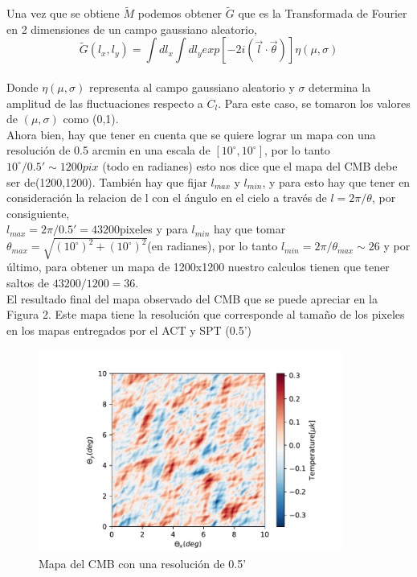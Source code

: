 \documentclass[a4paper]{article}
\begin{document}
Una vez que se obtiene $\tilde{M}$ podemos obtener $\tilde{G}$ que es la Transformada de Fourier en 2 dimensiones de un campo gaussiano aleatorio, 
\begin{equation}
    \tilde{G}(l_x,l_y)=\int dl_x \int dl_y exp[-2i(\vec{l} \cdot \vec{\theta})] \eta(\mu ,\sigma )
\end{equation}
\\
Donde $\eta(\mu,\sigma)$ representa al campo gaussiano aleatorio y $\sigma$ determina la amplitud de las fluctuaciones respecto a $C_l$. Para este caso, se tomaron los valores de $(\mu,\sigma)$ como (0,1).\\

Ahora bien, hay que tener en cuenta que se quiere lograr un mapa con una resolución de 0.5 arcmin en una escala de $[10^\circ,10^\circ]$, por lo tanto $10^{\circ}/0.5'\sim 1200 pix$ (todo en radianes) esto nos dice que el mapa del CMB debe ser de(1200,1200).
También hay que fijar $l_{max}$ y $l_{min}$, y para esto hay que tener en consideración la relacion de l con el ángulo en el cielo a través de  $l=2\pi/\theta$, por consiguiente,\\
$l_{max}=2\pi/0.5'=43200$pixeles y para $l_{min}$ hay que tomar $\theta_{max}=\sqrt{(10^{\circ})^2+(10^{\circ})^2}$(en radianes), por lo tanto $l_{min}=2\pi/\theta_{max} \sim 26$ y por último, para obtener un mapa de  1200x1200 nuestro calculos tienen que tener saltos de $43200/1200 =36$.\\

El resultado final del mapa observado del CMB que se puede apreciar en la Figura 2. Este mapa tiene la resolución  que corresponde al tamaño de los pixeles en los mapas entregados por el ACT y SPT (0.5')\\

\begin{figure}
\caption{Mapa del CMB con una resolución de 0.5'}
\centering
\includegraphics[width=10cm]{CMBfinal.pdf}
\end{figure}
\end{document}
